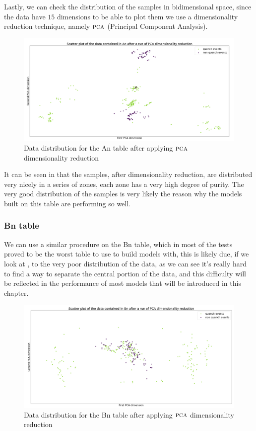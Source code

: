 Lastly, we can check the distribution of the samples in bidimensional space, since the data have
$15$ dimensions to be able to plot them we use a dimensionality reduction technique, namely
$\textsc{pca}$ (Principal Component Analysis).
\begin{figure}[h!]
	\centering
	\includegraphics[width=\linewidth]{img/An_distribution.png}
	\caption{Data distribution for the An table after applying $\textsc{pca}$ dimensionality
		reduction} \label{fig:an-dist}
\end{figure}

It can be seen in  that the samples, after dimensionality reduction, are distributed very nicely in a series
of zones, each zone has a very high degree of purity. The very good distribution of the samples is
very likely the reason why the models built on this table are performing so well.

\subsubsection{Bn table}
We can use a similar procedure on the Bn table, which in most of the tests proved to be the worst
table to use to build models with, this is likely due, if we look at , to the very
poor distribution of the data, as we can see it's really hard to find a way to separate the central
portion of the data, and this difficulty will be reflected in the performance of most models that
will be introduced in this chapter.
\begin{figure}[h!]
	\centering
	\includegraphics[width=\linewidth]{img/Bn_distribution.png}
	\caption{Data distribution for the Bn table after applying $\textsc{pca}$ dimensionality
		reduction} \label{fig:bn-dist}
\end{figure}

